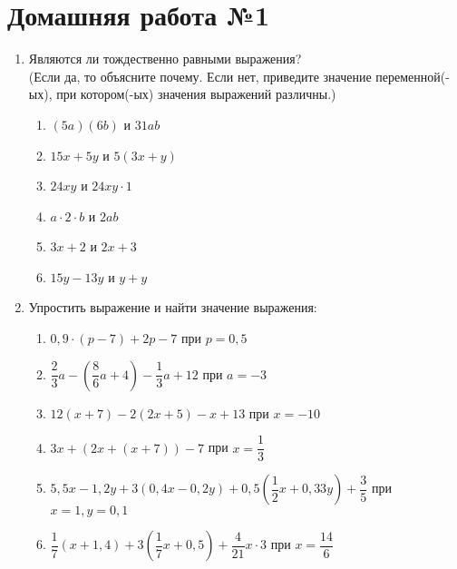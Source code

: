 \documentclass[12pt, a4paper]{article}
\begin{document}
		
	
	\section*{Домашняя работа №1}
		\begin{enumerate}
			\item Являются ли тождественно равными выражения?\\(Если да, то объясните почему. Если нет, приведите значение переменной(-ых), при котором(-ых) значения выражений различны.)
			\begin{multicols}{3}
				\begin{enumerate}[label=\asbuk*)]
					\item $(5a)(6b)$ и $31ab$
					\item $15x+5y$ и $5(3x+y)$
					\item $24xy$ и $24xy\cdot 1$
					\item $a\cdot2\cdot b$ и $2ab$
					\item $3x+2$ и $2x+3$
					\item $15y-13y$ и $y+y$
				\end{enumerate}
			\end{multicols}	
			\item Упростить выражение и найти значение выражения:
			\begin{enumerate}[label=\asbuk*)]
				\item $0,9\cdot(p-7)+2p-7$ при $p=0,5$
				\item $\dfrac{2}{3}a-(\dfrac{8}{6}a+4)-\dfrac{1}{3}a+12$ при $a=-3$
				\item $12(x+7)-2(2x+5)-x+13$ при $x=-10$
				\item $3x+(2x+(x+7))-7$ при $x=\dfrac{1}{3}$
				\item $5,5x-1,2y+3(0,4x-0,2y)+0,5(\dfrac{1}{2}x+0,33y)+\dfrac{3}{5}$ при $x=1, y=0,1$
				\item $\dfrac{1}{7}(x+1,4)+3(\dfrac{1}{7}x+0,5)+\dfrac{4}{21}x\cdot3$ при $x=\dfrac{14}{6}$
			\end{enumerate}	
		\end{enumerate}
\end{document}
